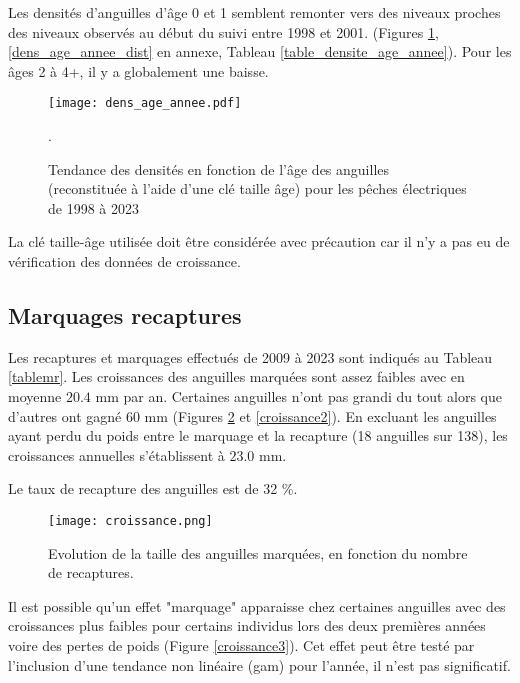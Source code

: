 \documentclass[10pt,twocolumn,titlepage,twoside]{article}\usepackage[]{graphicx}\usepackage[]{color}
\begin{document}
    
\small

\normalsize

Les densités d'anguilles d'âge 0 et 1 semblent remonter vers des
niveaux proches des niveaux observés au début du suivi entre 1998 et 2001. 
 (Figures \ref{dens_age_annee},
\ref{dens_age_annee_dist} en annexe, Tableau \ref{table_densite_age_annee}).
Pour les âges 2 à 4+, il y a globalement une baisse.

\begin{figure}[htbp]
\centering
\texttt{[image: dens\_age\_annee.pdf]}
\caption[Densité par âge.]{Tendance des densités en fonction de
l'âge des anguilles (reconstituée à l'aide d'une clé taille âge) pour
les pêches électriques de 1998 à 2023 \footnotemark}.
\label{dens_age_annee}
\end{figure}


La clé taille-âge utilisée doit être considérée avec précaution car il n'y a pas eu de
vérification des données de croissance.
\subsection{Marquages recaptures}

Les recaptures et marquages effectués de 2009 à 2023 sont indiqués au Tableau
\ref{tablemr}.
Les croissances des anguilles marquées sont
assez faibles avec en moyenne $20.4$ mm par an. Certaines anguilles
n'ont pas grandi du tout alors que
d'autres ont gagné 60 mm (Figures \ref{croissance} et \ref{croissance2}). En
excluant les anguilles ayant perdu du poids entre le marquage et la recapture
(18 anguilles sur
138), les croissances annuelles s'établissent à
$23.0$ mm.

Le taux de recapture des anguilles est de
32 \%.

\begin{figure}[htbp]
\centering
\texttt{[image: croissance.png]}
\caption[Taille anguilles marquées]{Evolution de la taille des anguilles
marquées, en fonction du nombre de recaptures.}
\label{croissance}
\end{figure}
Il est possible qu'un effet "marquage" apparaisse chez certaines anguilles avec
des croissances plus faibles pour certains individus lors des deux premières
années voire des pertes de poids (Figure \ref{croissance3}). Cet effet peut
être testé par l'inclusion d'une tendance non linéaire (gam) pour l'année, il
n'est pas significatif.
\end{document}
